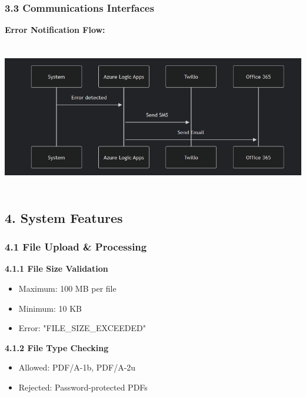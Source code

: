 \documentclass[
]{article}
\providecommand{\tightlist}{%
  \setlength{\itemsep}{0pt}\setlength{\parskip}{0pt}}
\begin{document}
\hypertarget{communications-interfaces}{%
\subsubsection{\texorpdfstring{\textbf{3.3 Communications
Interfaces}}{3.3 Communications Interfaces}}\label{communications-interfaces}}

\textbf{Error Notification Flow:}

\includegraphics[width=6.5in,height=2.57361in]{image2.png}

\hypertarget{system-features}{%
\subsection{\texorpdfstring{\textbf{4. System
Features}}{4. System Features}}\label{system-features}}

\hypertarget{file-upload-processing}{%
\subsubsection{\texorpdfstring{\textbf{4.1 File Upload \&
Processing}}{4.1 File Upload \& Processing}}\label{file-upload-processing}}

\textbf{4.1.1 File Size Validation}

\begin{itemize}
\tightlist
\item
  Maximum: 100 MB per file
\item
  Minimum: 10 KB
\item
  Error: "FILE\_SIZE\_EXCEEDED"
\end{itemize}

\textbf{4.1.2 File Type Checking}

\begin{itemize}
\tightlist
\item
  Allowed: PDF/A-1b, PDF/A-2u
\item
  Rejected: Password-protected PDFs
\end{itemize}
\end{document}
